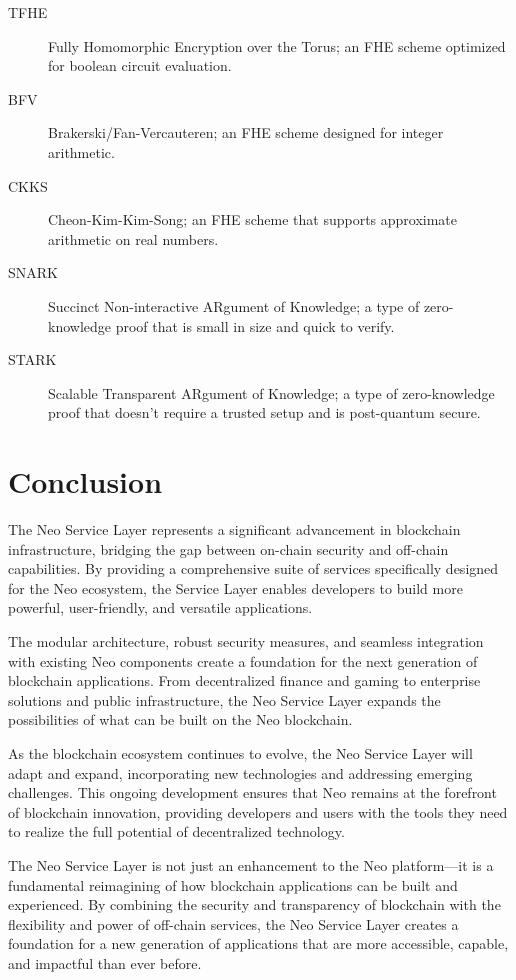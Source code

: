 \documentclass[11pt]{article}
\begin{document}
\begin{description}
    \item[TFHE] Fully Homomorphic Encryption over the Torus; an FHE scheme optimized for boolean circuit evaluation.
    
    \item[BFV] Brakerski/Fan-Vercauteren; an FHE scheme designed for integer arithmetic.
    
    \item[CKKS] Cheon-Kim-Kim-Song; an FHE scheme that supports approximate arithmetic on real numbers.
    
    \item[SNARK] Succinct Non-interactive ARgument of Knowledge; a type of zero-knowledge proof that is small in size and quick to verify.
    
    \item[STARK] Scalable Transparent ARgument of Knowledge; a type of zero-knowledge proof that doesn't require a trusted setup and is post-quantum secure.
\end{description}

\section{Conclusion}
\label{subsec:nsl-conclusion}

The Neo Service Layer represents a significant advancement in blockchain infrastructure, bridging the gap between on-chain security and off-chain capabilities. By providing a comprehensive suite of services specifically designed for the Neo ecosystem, the Service Layer enables developers to build more powerful, user-friendly, and versatile applications.

The modular architecture, robust security measures, and seamless integration with existing Neo components create a foundation for the next generation of blockchain applications. From decentralized finance and gaming to enterprise solutions and public infrastructure, the Neo Service Layer expands the possibilities of what can be built on the Neo blockchain.

As the blockchain ecosystem continues to evolve, the Neo Service Layer will adapt and expand, incorporating new technologies and addressing emerging challenges. This ongoing development ensures that Neo remains at the forefront of blockchain innovation, providing developers and users with the tools they need to realize the full potential of decentralized technology.

The Neo Service Layer is not just an enhancement to the Neo platform—it is a fundamental reimagining of how blockchain applications can be built and experienced. By combining the security and transparency of blockchain with the flexibility and power of off-chain services, the Neo Service Layer creates a foundation for a new generation of applications that are more accessible, capable, and impactful than ever before.
\end{document}
